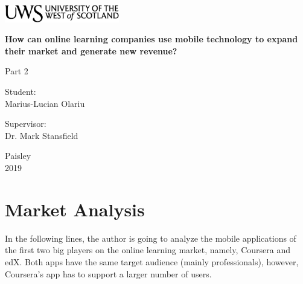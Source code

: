 \documentclass[version=last,fontsize=13pt]{scrartcl}
\begin{document}
\begin{titlepage}
	\begin{center}	
		\includegraphics[width = 5cm,height = 1.5cm]{./imgs/uws_logo.png}\\[5cm]

	{ \huge \bfseries %
		How can online learning companies use mobile technology to expand their market and generate new revenue?\\ \Large 
}
	\vspace{2cm}
	
	{\huge
		Part 2 
	}

	\vspace{2cm}			
			

			
		\begin{flushright}
				\large Student:\\
				Marius-Lucian Olariu\\[1cm]
		\end{flushright}
		
	
		\begin{flushleft}
			 \large
				Supervisor: \\
				Dr. Mark Stansfield \\[1cm]
		\end{flushleft}
		
	\vspace{2cm}	
	
		
		\vfill

			{\large {Paisley \\ 2019}}
		\end{center}
\end{titlepage}

\renewcommand{\labelenumi}{\roman{enumi}}

\newpage

\tableofcontents

\newpage

\listoffigures

\newpage

\section{Market Analysis}
	In the following lines, the author is going to analyze the mobile applications of the first two big players on the online learning market, namely, Coursera and edX. Both apps have the same target audience (mainly professionals), however, Coursera's app has to support a larger number of users.\\
\end{document}
